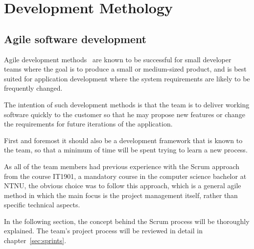 \section{Development Methology}

\subsection{Agile software development}

Agile development methods~\cite{scrum} are known to be successful for small developer teams where the goal is to produce a small or medium-sized product, and is best suited for application development where the system requirements are likely to be frequently changed.

The intention of such development methods is that the team is to deliver working software quickly to the customer so that he may propose new features or change the requirements for future iterations of the application.

 First and foremost it should also be a development framework that is known to the team, so that a minimum of time will be spent trying to learn a new process.

As all of the team members had previous experience with the Scrum approach from the course IT1901, a mandatory course in the computer science bachelor at NTNU, the obvious choice was to follow this approach, which is a general agile method in which the main focus is the project management itself, rather than specific technical aspects. 

In the following section, the concept behind the Scrum process will be thoroughly explained. The team's project process will be reviewed in detail in chapter~\ref{sec:sprints}.

%